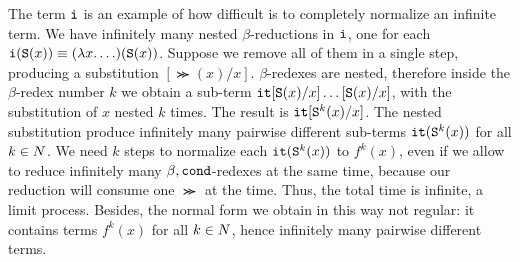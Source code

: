 The term ${\tt i}$ is an example of how difficult is to completely normalize
an infinite term. We have infinitely many nested $\beta$-reductions in
${\tt i}$, one for each ${\tt i}({\tt S} (x)) \equiv (\lambda x.\ldots)({\tt S} (x))$. 
Suppose we remove all of them in a single step, producing a substitution
$[\Succ (x)/x]$. $\beta$-redexes are nested, therefore 
inside the $\beta$-redex number $k$ we obtain a sub-term ${\tt it}[{\tt S} (x)/x]
\ldots[{\tt S} (x)/x]$, with the substitution of $x$ nested $k$ times. 
The result is ${\tt it}[{\tt S} ^k(x)/x]$.
The nested substitution produce infinitely many pairwise different sub-terms 
${\tt it}({\tt S} ^k(x))$ for all $k \in {N}$. 
We need $k$ steps to normalize each ${\tt it}({\tt S} ^k(x))$ to $f^k(x)$, 
even if we allow to reduce infinitely many 
$\beta, {\tt cond}$-redexes at the same time, because our reduction will consume one 
$\Succ$  at the time. Thus, the total time is infinite, a limit process. 
Besides, the normal form we obtain in this way not regular: it contains terms 
$f^k(x)$ for all $k \in {N}$, hence infinitely many pairwise different terms. 




